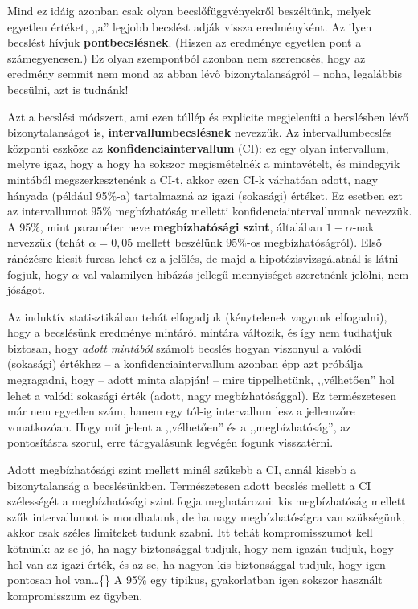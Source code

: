 \documentclass[]{book}
\begin{document}
Mind ez idáig azonban csak olyan becslőfüggvényekről beszéltünk, melyek egyetlen értéket, ,,a'' legjobb becslést adják vissza eredményként. Az ilyen becslést hívjuk \textbf{pontbecslésnek}. (Hiszen az eredménye egyetlen pont a számegyenesen.) Ez olyan szempontból azonban nem szerencsés, hogy az eredmény semmit nem mond az abban lévő bizonytalanságról -- noha, legalábbis becsülni, azt is tudnánk!

Azt a becslési módszert, ami ezen túllép és explicite megjeleníti a becslésben lévő bizonytalanságot is, \textbf{intervallumbecslésnek} nevezzük. Az intervallumbecslés központi eszköze az \textbf{konfidenciaintervallum} (CI): ez egy olyan intervallum, melyre igaz, hogy a hogy ha sokszor megismételnék a mintavételt, és mindegyik mintából megszerkesztenénk a CI-t, akkor ezen CI-k várhatóan adott, nagy hányada (például 95\%-a) tartalmazná az igazi (sokasági) értéket. Ez esetben ezt az intervallumot 95\% megbízhatóság melletti konfidenciaintervallumnak nevezzük. A 95\%, mint paraméter neve \textbf{megbízhatósági szint}, általában \(1-\alpha\)-nak nevezzük (tehát \(\alpha=0,\!05\) mellett beszélünk 95\%-os megbízhatóságról). Első ránézésre kicsit furcsa lehet ez a jelölés, de majd a hipotézisvizsgálatnál is látni fogjuk, hogy \(\alpha\)-val valamilyen hibázás jellegű mennyiséget szeretnénk jelölni, nem jóságot.

Az induktív statisztikában tehát elfogadjuk (kénytelenek vagyunk elfogadni), hogy a becslésünk eredménye mintáról mintára változik, és így nem tudhatjuk biztosan, hogy \emph{adott mintából} számolt becslés hogyan viszonyul a valódi (sokasági) értékhez -- a konfidenciaintervallum azonban épp azt próbálja megragadni, hogy -- adott minta alapján! -- mire tippelhetünk, ,,vélhetően'' hol lehet a valódi sokasági érték (adott, nagy megbízhatósággal). Ez természetesen már nem egyetlen szám, hanem egy tól-ig intervallum lesz a jellemzőre vonatkozóan. Hogy mit jelent a ,,vélhetően'' és a ,,megbízhatóság'', az pontosításra szorul, erre tárgyalásunk legvégén fogunk visszatérni.

Adott megbízhatósági szint mellett minél szűkebb a CI, annál kisebb a bizonytalanság a becslésünkben. Természetesen adott becslés mellett a CI szélességét a megbízhatósági szint fogja meghatározni: kis megbízhatóság mellett szűk intervallumot is mondhatunk, de ha nagy megbízhatóságra van szükségünk, akkor csak széles limiteket tudunk szabni. Itt tehát kompromisszumot kell kötnünk: az se jó, ha nagy biztonsággal tudjuk, hogy nem igazán tudjuk, hogy hol van az igazi érték, és az se, ha nagyon kis biztonsággal tudjuk, hogy igen pontosan hol van\dots\{\} A 95\% egy tipikus, gyakorlatban igen sokszor használt kompromisszum ez ügyben.
\end{document}
